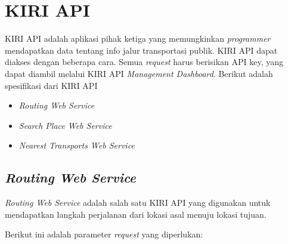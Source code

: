 
\section{KIRI API}
KIRI API adalah aplikasi pihak ketiga yang memungkinkan \textit{programmer} mendapatkan data tentang info jalur transportasi publik. KIRI API dapat diakses dengan beberapa cara. Semua \textit{request} harus berisikan API key, yang dapat diambil melalui KIRI API \textit{Management Dashboard}. Berikut adalah spesifikasi dari KIRI API

\begin{itemize}
	\item \textit{Routing Web Service}
	\item \textit{Search Place Web Service}
	\item \textit{Nearest Transports Web Service}
\end{itemize}

\subsection{\textit{Routing Web Service}}
\textit{Routing Web Service} adalah salah satu KIRI API yang digunakan untuk mendapatkan langkah perjalanan dari lokasi asal menuju lokasi tujuan.

Berikut ini adalah parameter \textit{request} yang diperlukan:

